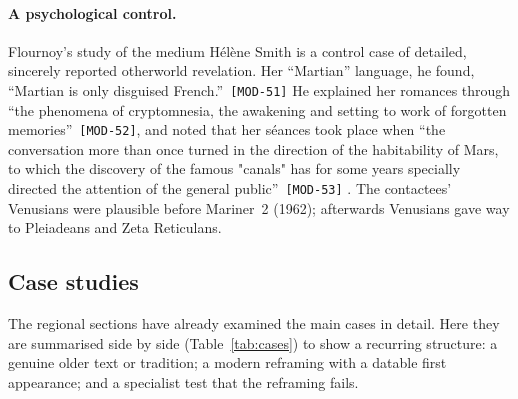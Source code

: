 \documentclass[11pt,a4paper]{article}
\newcommand{\pid}[1]{\texttt{\small #1}}
\begin{document}
\paragraph{A psychological control.} Flournoy's study of the medium Hélène Smith is a control case of detailed, sincerely reported otherworld revelation. Her ``Martian'' language, he found, \enquote{Martian is only disguised French.}~\pid{[MOD-51]} He explained her romances through \enquote{the phenomena of cryptomnesia, the awakening and setting to work of forgotten memories}~\pid{[MOD-52]}, and noted that her séances took place when \enquote{the conversation more than once turned in the direction of the habitability of Mars, to which the discovery of the famous "canals" has for some years specially directed the attention of the general public}~\pid{[MOD-53]} \parencite{flournoy1900india,henry1901martien}. The contactees' Venusians were plausible before Mariner~2 (1962); afterwards Venusians gave way to Pleiadeans and Zeta Reticulans.

\subsection{Case studies}

The regional sections have already examined the main cases in detail. Here they are summarised side by side (Table~\ref{tab:cases}) to show a recurring structure: a genuine older text or tradition; a modern reframing with a datable first appearance; and a specialist test that the reframing fails.
\end{document}
